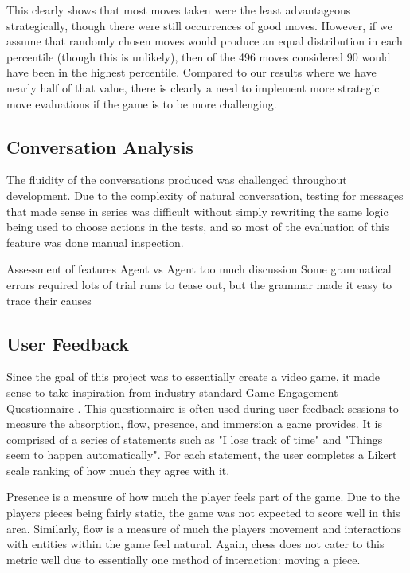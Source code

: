 \documentclass{article}
\begin{document}
This clearly shows that most moves taken were the least advantageous strategically, though there were still occurrences of good moves. However, if we assume that randomly chosen moves would produce an equal distribution in each percentile (though this is unlikely), then of the 496 moves considered 90 would have been in the highest percentile. Compared to our results where we have nearly half of that value, there is clearly a need to implement more strategic move evaluations if the game is to be more challenging.

\subsection{Conversation Analysis}

The fluidity of the conversations produced was challenged throughout development. Due to the complexity of natural conversation, testing for messages that made sense in series was difficult without simply rewriting the same logic being used to choose actions in the tests, and so most of the evaluation of this feature was done manual inspection.

Assessment of features
Agent vs Agent too much discussion
Some grammatical errors required lots of trial runs to tease out, 
but the grammar made it easy to trace their causes

\subsection{User Feedback}

Since the goal of this project was to essentially create a video game, it made sense to take inspiration from industry standard Game Engagement Questionnaire \cite{geq}. This questionnaire is often used during user feedback sessions to measure the absorption, flow, presence, and immersion a game provides. It is comprised of a series of statements such as "I lose track of time" and "Things seem to happen automatically". For each statement, the user completes a Likert scale ranking of how much they agree with it.

Presence is a measure of how much the player feels part of the game. Due to the players pieces being fairly static, the game was not expected to score well in this area. Similarly, flow is a measure of much the players movement and interactions with entities within the game feel natural. Again, chess does not cater to this metric well due to essentially one method of interaction: moving a piece. 
\end{document}

